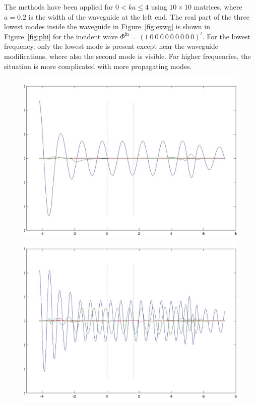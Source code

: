 \documentclass[numreferences]{kluwer}
\renewcommand{\Phi}{\varPhi}
\renewcommand{\vec}[1]{\bm{#1}}
\renewcommand{\Phi}{\varPhi}
\newcommand{\Phiin}{\vec\Phi^{\text{in}}}
\begin{document}
The methods have been applied for $0<ka\le4$ using $10\times10$
matrices, where $a=0.2$ is the width of the waveguide at the left
end. The real part of the three lowest modes inside the waveguide in
Figure~\ref{fig:exwg} is shown in Figure~\ref{fig:phi} for the
incident wave $\Phiin=(1\ 0\ 0\ 0\ 0\ 0\ 0\ 0\ 0\ 0)^t$. For the
lowest frequency, only the lowest mode is present except near the
waveguide modifications, where also the second mode is visible. For
higher frequencies, the situation is more complicated with more
propagating modes.

\begin{figure}[htb]
  \centering
  \includegraphics[width=\linewidth]{phin1a}
  \includegraphics[width=\linewidth]{phin2a}

\end{figure}
\end{document}
